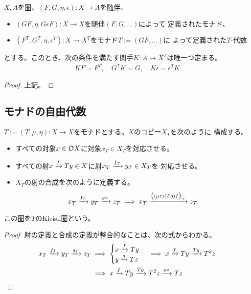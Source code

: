 {	\begin{proposition}[随伴と代数の比較]\label{prop:随伴と代数の比較} %
		$X,A$を圏、$(F,G,\eta,\epsilon):X\to A$を随伴、
		\begin{itemize}\setlength{\itemsep}{-1mm} %
			\item $(GF,\eta,G\epsilon F):X\to X$を随伴$(F,G,\dots)$によって
			定義されたモナド、
			\item $(F^T,G^T,\eta,\epsilon^T):X\to X^T$をモナド$T:=(GF,\dots)$に
			よって定義された$T$-代数
		\end{itemize} %
		とする。このとき、次の条件を満たす関手$K:A\to X^T$は唯一つ定まる。
		\begin{equation*}\begin{split}
			KF = F^T ,\quad G^TK = G ,\quad K\epsilon = \epsilon^TK
		\end{split}\end{equation*}
	\end{proposition} %
	\begin{proof} %
		上記。
	\end{proof} %
\subsection{モナドの自由代数}\label{s2:モナドの自由代数} %
	\begin{definition}[Kleisli圏]\label{def:Kleisli圏} %
		$T:=(T,\mu,\eta):X\to X$をモナドとする。$X$のコピー$X_T$を次のように
		構成する。
		\begin{itemize}\setlength{\itemsep}{-1mm} %
			\item すべての対象$x\in\mathfrak{O} X$に対象$x_T\in X_T$を対応させる。
			\item すべての射$x\xrightarrow[{}]{f}Ty\in X$に射$x_T\xrightarrow[{}]{f_T}y_T\in X_T$を
			対応させる。
			\item $X_T$の射の合成を次のように定義する。
			\begin{equation*}\begin{split}
				x_T\xrightarrow[{}]{f_T}y_T\xrightarrow[{}]{g_T}z_T \implies 
				x_T\xrightarrow[{}]{\mathinner{\bigl({(\mu z)(Tg)f}\bigr)}_T}z_T
			\end{split}\end{equation*}
		\end{itemize} %
		この圏を$T$のKleisli圏という。\EOP
	\end{definition} %
	\begin{proof} %
		射の定義と合成の定義が整合的なことは、次の式からわかる。
		\begin{equation*}\begin{split}
			x_T\xrightarrow[{}]{f_T}y_T\xrightarrow[{}]{g_T}z_T &\implies \begin{cases}
				x\xrightarrow[{}]{f}Ty \\
				y\xrightarrow[{}]{g}Tz
			\end{cases} \implies x\xrightarrow[{}]{f}Ty\xrightarrow[{}]{Tg}T^2z \\
			&\implies x\xrightarrow[{}]{f}Ty\xrightarrow[{}]{Tg}T^2z\xrightarrow[{}]{\mu z}Tz
		\end{split}\end{equation*}
	\end{proof} %

}
